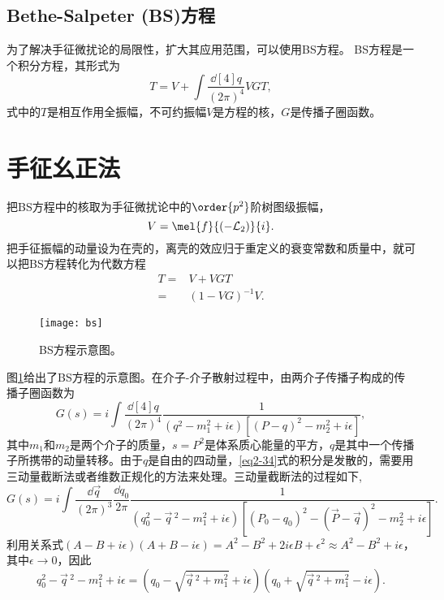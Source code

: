 \subsection{Bethe-Salpeter (BS)方程}
为了解决手征微扰论的局限性，扩大其应用范围，可以使用BS方程\cite{OLLER1997438,KAISER1995325,OSET199899,KAISER199523,NIEVES199930,NIEVES200057}。
BS方程是一个积分方程，其形式为
\begin{equation}
	T=V+\int\frac{\dd[4]{q}}{(2\pi)^{4}}VGT,
\end{equation}
式中的$T$是相互作用全振幅，不可约振幅$V$是方程的核，$G$是传播子圈函数。
\section{手征幺正法}
把BS方程中的核取为手征微扰论中的$\order{p^2}$阶树图级振幅，
\begin{equation}
	V=\mel{f}{(-\mathcal{L}_{2})}{i}.
\end{equation}
把手征振幅的动量设为在壳的，离壳的效应归于重定义的衰变常数和质量中\cite{OLLER1997438}，就可以把BS方程转化为代数方程
\begin{equation}
\begin{split}
	T=&V+VGT\\
	=&(1-VG)^{-1}V.
\end{split}
\end{equation}
\begin{figure}[h]
	\centering
	\texttt{[image: bs]}
	\caption[BS方程示意图]{BS方程示意图。}
	\label{BS}
\end{figure}
图\ref{BS}给出了BS方程的示意图。在介子-介子散射过程中，由两介子传播子构成的传播子圈函数为
\begin{equation}
	\label{eq2-34}
	G(s)=i\int\frac{\dd[4]{q}}{(2\pi)^4}\frac{1}{(q^2-m_{1}^2+i\epsilon)[(P-q)^2-m_{2}^2+i\epsilon]},
\end{equation}
其中$m_{1}$和$m_{2}$是两个介子的质量，$s=P^2$是体系质心能量的平方，$q$是其中一个传播子所携带的动量转移。由于$q$是自由的四动量，\eqref{eq2-34}式的积分是发散的，需要用三动量截断法或者维数正规化的方法来处理。三动量截断法的过程如下,
\begin{equation}
	\label{G}
	G(s)=i\int\frac{\dd{\vec{q}}}{(2\pi)^{3}}\frac{\dd{q_{0}}}{2\pi}\frac{1}{(q_{0}^2-\vec{q}\,^2-m^2_{1}+i\epsilon)[(P_{0}-q_{0})^2-(\vec{P}-\vec{q})^2-m_{2}^2+i\epsilon]}.
\end{equation}
利用关系式$(A-B+i\epsilon)(A+B-i\epsilon)=A^2-B^2+2i\epsilon B+\epsilon^2\approx A^2-B^2+i\epsilon$，其中$\epsilon\to0$，因此
\begin{equation}
	q_{0}^2-\vec{q}\,^2-m^2_{1}+i\epsilon=(q_{0}-\sqrt{\vec{q}\,^2+m^2_{1}}+i\epsilon)(q_{0}+\sqrt{\vec{q}\,^2+m^2_{1}}-i\epsilon).
\end{equation}
